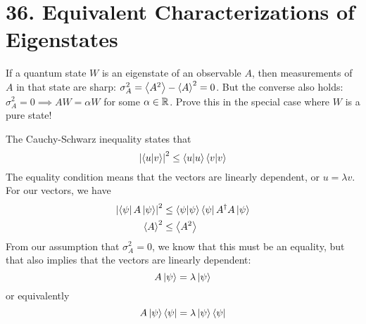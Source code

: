\documentclass[a4paper,twoside]{article}
\begin{document}
\section*{36. Equivalent Characterizations of Eigenstates}
If a quantum state $ W $ is an eigenstate of an observable $ A $, then measurements of $ A $ in that state are sharp: $ \sigma_A^2 = \ev{A^2} - \ev{A}^2 = 0 $. But the converse also holds: $ \sigma^2_A = 0 \implies AW = \alpha W $ for some $ \alpha \in \mathbb{R} $. Prove this in the special case where $ W $ is a pure state!
\begin{problem}
    The Cauchy-Schwarz inequality states that
    \begin{equation}
        \abs{\bra{u}\ket{v}}^2 \leq\bra{u}\ket{u}\bra{v}\ket{v}
    \end{equation}
    The equality condition means that the vectors are linearly dependent, or $ u = \lambda v $. For our vectors, we have
    \begin{align}
        \abs{\bra{\psi} A\ket{\psi}}^2 &\leq\bra{\psi}\ket{\psi}\bra{\psi} A^\dagger A\ket{\psi} \\
        \ev{A}^2 &\leq \ev{A^2}
    \end{align}
    From our assumption that $ \sigma^2_A = 0 $, we know that this must be an equality, but that also implies that the vectors are linearly dependent:
    \begin{equation}
        A\ket{\psi} = \lambda\ket{\psi}
    \end{equation}
    or equivalently
    \begin{equation}
        A\ket{\psi}\bra{\psi} = \lambda\ket{\psi}\bra{\psi}
    \end{equation}
\end{problem}
\end{document}
